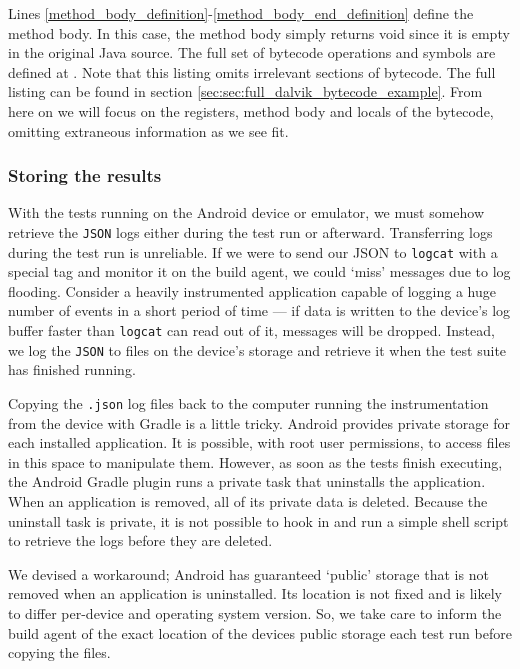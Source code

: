 Lines \ref{method_body_definition}-\ref{method_body_end_definition} define the method body. In this case, the method body simply returns void since it is empty in the original Java source. The full set of bytecode operations and symbols are defined at \cite{dalvikBytecode}. Note that this listing omits irrelevant sections of bytecode. The full listing can be found in section \ref{sec:sec:full_dalvik_bytecode_example}. From here on we will focus on the registers, method body and locals of the bytecode, omitting extraneous information as we see fit.



\subsubsection{Storing the results}

With the tests running on the Android device or emulator, we must somehow retrieve the {\tt JSON} logs either during the test run or afterward. Transferring logs during the test run is unreliable. If we were to send our JSON to {\tt logcat} with a special tag and monitor it on the build agent, we could {\lq}miss{\rq} messages due to log flooding. Consider a heavily instrumented application capable of logging a huge number of events in a short period of time --- if data is written to the device's log buffer faster than {\tt logcat} can read out of it, messages will be dropped. Instead, we log the {\tt JSON} to files on the device's storage and retrieve it when the test suite has finished running.

Copying the {\tt .json} log files back to the computer running the instrumentation from the device with Gradle is a little tricky. Android provides private storage for each installed application. It is possible, with root user permissions, to access files in this space to manipulate them. However, as soon as the tests finish executing, the Android Gradle plugin runs a private task that uninstalls the application. When an application is removed, all of its private data is deleted. Because the uninstall task is private, it is not possible to hook in and run a simple shell script to retrieve the logs before they are deleted.

We devised a workaround; Android has guaranteed {\lq}public{\rq} storage that is not removed when an application is uninstalled. Its location is not fixed and is likely to differ per-device and operating system version. So, we take care to inform the build agent of the exact location of the devices public storage each test run before copying the files.

